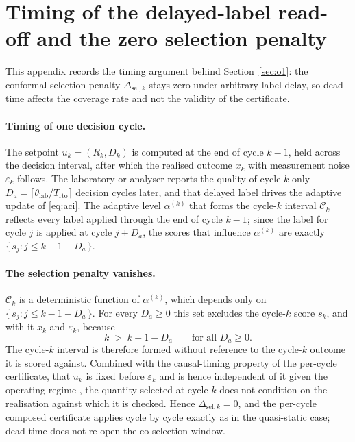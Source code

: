\section{Timing of the delayed-label read-off and the zero selection penalty}
\label{app:o1}

This appendix records the timing argument behind Section~\ref{sec:o1}: the conformal selection
penalty $\Delta_{\mathrm{sel},k}$ stays zero under arbitrary label delay, so dead time affects
the coverage rate and not the validity of the certificate.

\paragraph{Timing of one decision cycle.}
The setpoint $u_k=(R_k,D_k)$ is computed at the end of cycle $k-1$, held across the decision
interval, after which the realised outcome $x_k$ with measurement noise $\varepsilon_k$ follows.
The laboratory or analyser reports the quality of cycle $k$ only
$D_a=\lceil \theta_{\mathrm{lab}}/T_{\mathrm{rto}}\rceil$ decision cycles later, and that delayed
label drives the adaptive update of \eqref{eq:aci}. The adaptive level $\alpha^{(k)}$ that forms
the cycle-$k$ interval $\mathcal{C}_k$ reflects every label applied through the end of cycle
$k-1$; since the label for cycle $j$ is applied at cycle $j+D_a$, the scores that influence
$\alpha^{(k)}$ are exactly $\{\, s_j : j \le k-1-D_a \,\}$.

\paragraph{The selection penalty vanishes.}
$\mathcal{C}_k$ is a deterministic function of $\alpha^{(k)}$, which depends only on
$\{\, s_j : j \le k-1-D_a \,\}$. For every $D_a\ge 0$ this set excludes the cycle-$k$ score
$s_k$, and with it $x_k$ and $\varepsilon_k$, because
\begin{equation*}
  k \;>\; k-1-D_a \qquad \text{for all } D_a \ge 0 .
\end{equation*}
The cycle-$k$ interval is therefore formed without reference to the cycle-$k$ outcome it is
scored against. Combined with the causal-timing property of the per-cycle certificate, that
$u_k$ is fixed before $\varepsilon_k$ and is hence independent of it given the operating regime
\citep{busico_m4}, the quantity selected at cycle $k$ does not condition on the realisation
against which it is checked. Hence $\Delta_{\mathrm{sel},k}=0$, and the per-cycle composed
certificate applies cycle by cycle exactly as in the quasi-static case; dead time does not
re-open the co-selection window.

